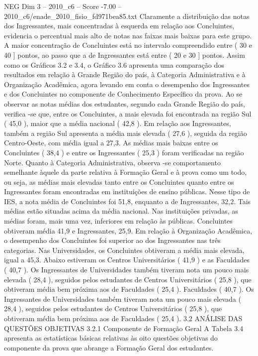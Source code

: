 \begin{textsample}{NEG Dim 3 – 2010\_c6 – Score -7.00 – 2010\_c6/enade\_2010\_fisio\_fd971bea85.txt}
Claramente a distribuição das notas dos Ingressantes, mais concentradas à esquerda em relação aos Concluintes, evidencia o percentual mais alto de notas nas faixas mais baixas para este grupo.
A maior concentração de Concluintes está no intervalo compreendido entre ( 30 e 40 ] pontos, ao passo que a de Ingressantes está entre ( 20 e 30 ] pontos.
Assim como os Gráficos 3.2 e 3.4, o Gráfico 3.6 apresenta uma comparação dos resultados em relação à Grande Região do país, à Categoria Administrativa e à Organização Acadêmica, agora levando em conta o desempenho dos Ingressantes e dos Concluintes no componente de Conhecimento Específico da prova.
Ao se observar as notas médias dos estudantes, segundo cada Grande Região do país, verifica -se que, entre os Concluintes, a mais elevada foi encontrada na região Sul ( 45,0 ), maior que a média nacional ( 42,8 ).
Em relação aos Ingressantes, também a região Sul apresenta a média mais elevada ( 27,6 ), seguida da região Centro-Oeste, com média igual a 27,3.
As médias mais baixas entre os Concluintes ( 38,4 ) e entre os Ingressantes ( 25,3 ) foram verificadas na região Norte.
Quanto à Categoria Administrativa, observa -se comportamento semelhante àquele da parte relativa à Formação Geral e à prova como um todo, ou seja, as médias mais elevadas tanto entre os Concluintes quanto entre os Ingressantes foram encontradas em instituições de ensino públicas.
Nesse tipo de IES, a nota média de Concluintes foi 51,8, enquanto a de Ingressantes, 32,2.
Tais médias estão situadas acima da média nacional.
Nas instituições privadas, as médias foram, mais uma vez, inferiores em relação às públicas.
Concluintes obtiveram média 41,9 e Ingressantes, 25,9.
Em relação à Organização Acadêmica, o desempenho dos Concluintes foi superior ao dos Ingressantes nas três categorias.
Nas Universidades, os Concluintes obtiveram a média mais elevada, igual a 45,3.
Abaixo estiveram os Centros Universitários ( 41,9 ) e as Faculdades ( 40,7 ).
Os Ingressantes de Universidades também tiveram nota um pouco mais elevada ( 28,4 ), seguidos pelos estudantes de Centros Universitários ( 25,8 ), que obtiveram média bem próxima aos de Faculdades ( 25,4 ).
Faculdades ( 40,7 ).
Os Ingressantes de Universidades também tiveram nota um pouco mais elevada ( 28,4 ), seguidos pelos estudantes de Centros Universitários ( 25,8 ), que obtiveram média bem próxima aos de Faculdades ( 25,4 ). 3.2 ANÁLISE DAS QUESTÕES OBJETIVAS 3.2.1 Componente de Formação Geral A Tabela 3.4 apresenta as estatísticas básicas relativas às oito questões objetivas do componente da prova que abrange a Formação Geral dos estudantes.

\end{textsample}
